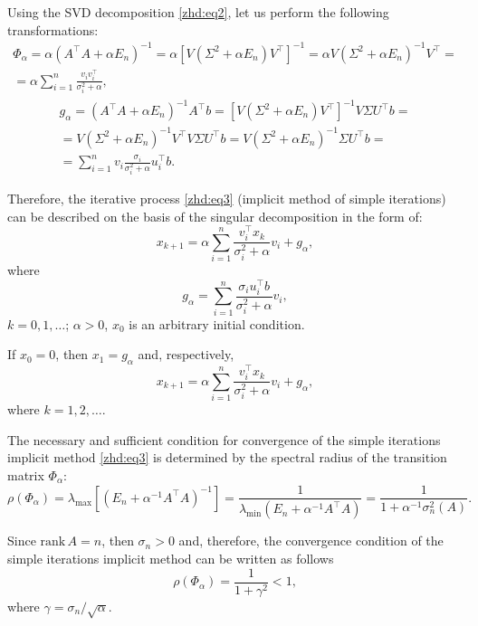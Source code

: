 Using the SVD decomposition \eqref{zhd:eq2}, let us perform the following transformations:
\begin{multline*}
\Phi_\alpha=\alpha(A^\top A+\alpha E_n)^{-1}=
   \alpha[V(\Sigma^2+\alpha E_n)V^\top]^{-1}=
   \alpha V(\Sigma^2+\alpha E_n)^{-1}V^\top=
\\
 =\alpha\sum_{i=1}^n\frac{v_{i}v_{i}^\top}{\sigma_i^2+\alpha},
\end{multline*}
\begin{multline*}
g_\alpha=(A^\top A+\alpha E_n)^{-1}A^\top b=
  [V(\Sigma^2+\alpha E_n)V^\top]^{-1}V\Sigma U^\top b=
\\
 =V(\Sigma^2+\alpha E_n)^{-1}V^\top V\Sigma U^\top b=V(\Sigma^2+\alpha E_n)^{-1}\Sigma  U^\top b=
\\
=\sum_{i=1}^nv_i\frac{\sigma_i}{\sigma_i^2+\alpha}u_i^\top b. 
\end{multline*}

Therefore, the iterative process \eqref{zhd:eq3} (implicit method of simple iterations) can be described on the basis of the singular decomposition in the form of:
\begin{equation}
 x_{k+1}=\alpha\sum_{i=1}^n\frac{v_i^\top  x_k}{\sigma_i^2+\alpha}v_i+g_{\alpha},
\label{zhd:eq4} 
\end{equation}
where
\begin{equation}
\label{zhd:eq5} 
g_\alpha=\sum_{i=1}^n\frac{\sigma_i u_i^\top b}{\sigma_i^2+\alpha}v_i, 
\end{equation}
$k=0, 1, \dots$; $\alpha>0$, $x_0$ is an arbitrary initial condition.

If $x_0=0$, then $x_1=g_\alpha$ and, respectively,
\begin{equation}
\label{zhd:eq6} 
x_{k+1}=\alpha\sum_{i=1}^n\frac{v_i^\top  x_k}{\sigma_i^2+\alpha}v_i+g_{\alpha},
\end{equation}
where $k=1, 2, \dots$.

\smallskip

The necessary and sufficient condition for convergence of the simple iterations implicit method \eqref{zhd:eq3}  is determined by the spectral radius of the transition matrix
$\Phi_\alpha$:
$$ 
\rho(\Phi_\alpha)=\lambda_{\max}\left[(E_n+\alpha^{-1} A^\top  A)^{-1}\right]=
\frac{1}{\lambda_{\min}(E_n+\alpha^{-1} A^\top  A)}=\frac{1}{1+\alpha^{-1}\sigma^2_n(A)}. 
$$

Since $\mathrm{rank}\,A=n$, then $\sigma_n>0$ and, therefore, the convergence condition of the simple iterations implicit method can be written as follows
\begin{equation}
\label{zhd:eq7} 
\rho(\Phi_\alpha)=\frac{1}{1+\gamma^2}<1, 
\end{equation}
where $\gamma=\sigma_n/\sqrt{\alpha}$.

